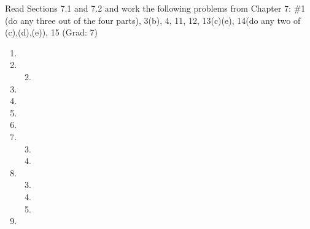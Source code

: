\documentclass{article}
\begin{document}
Read Sections 7.1 and 7.2 and work the following problems from Chapter 7: \#1 (do any three out of the four parts), 3(b), 4, 11, 12, 13(c)(e), 14(do any two of (c),(d),(e)), 15 (Grad: 7)
\begin{enumerate}
\item
\setcounter{enumi}{2}
\item
\begin{enumerate}
\setcounter{enumii}{1}
\item
\end{enumerate}
\item
\setcounter{enumi}{6}
\item
\setcounter{enumi}{10}
\item
\item
\item
\begin{enumerate}
\setcounter{enumii}{2}
\item
\setcounter{enumii}{4}
\item
\end{enumerate}
\item
\begin{enumerate}
\setcounter{enumii}{2}
\item
\item
\item
\end{enumerate}
\item
\end{enumerate}
\end{document}
